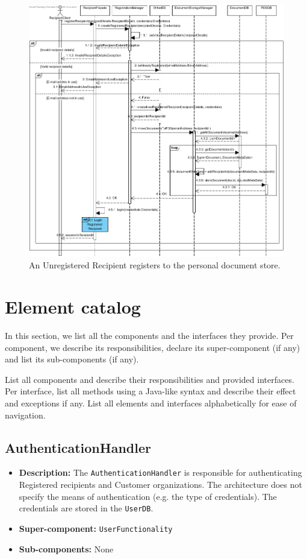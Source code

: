 \documentclass[a4paper,10pt]{article}
\begin{document}
\begin{figure}[!htp]
    \centering
    \includegraphics[width=\textwidth]{RegisterToPdS.png}
    \caption{An Unregistered Recipient registers to the personal document store.
        }\label{fig:seq_RegisterToPDS}
\end{figure}

\FloatBarrier

\appendix
\section{Element catalog}\label{app:catalog}
In this section, we list all the components and the interfaces they provide. Per component, we describe its responsibilities, declare its super-component (if any) and list its sub-components (if any).



List all components and describe their responsibilities and provided
interfaces.
Per interface, list all methods using a Java-like syntax and describe their
effect and exceptions if any.
List all elements and interfaces alphabetically for ease of navigation.

\subsection{AuthenticationHandler}
\begin{itemize}
    \item \textbf{Description:} The \texttt{AuthenticationHandler} is responsible for authenticating Registered recipients and Customer organizations. The architecture does not specify the means of authentication (e.g. the type of credentials). The credentials are stored in the \texttt{UserDB}.
    \item \textbf{Super-component:} \texttt{UserFunctionality}
    \item \textbf{Sub-components:} None
\end{itemize}
\end{document}
